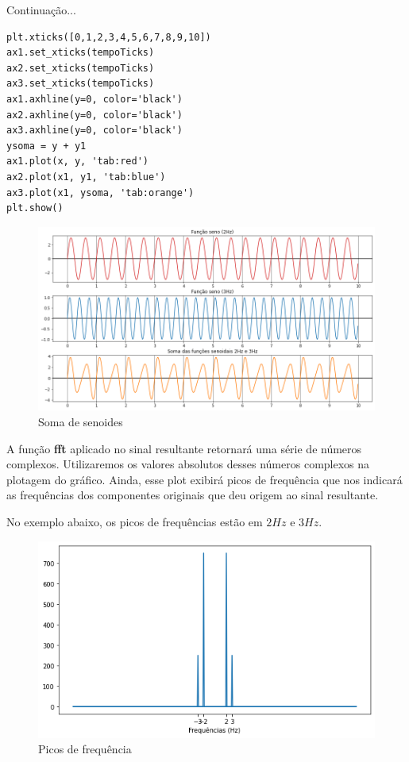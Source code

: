 Continuação...

\begin{verbatim}
plt.xticks([0,1,2,3,4,5,6,7,8,9,10])
ax1.set_xticks(tempoTicks)
ax2.set_xticks(tempoTicks)
ax3.set_xticks(tempoTicks)
ax1.axhline(y=0, color='black')
ax2.axhline(y=0, color='black')
ax3.axhline(y=0, color='black')
ysoma = y + y1
ax1.plot(x, y, 'tab:red')
ax2.plot(x1, y1, 'tab:blue')
ax3.plot(x1, ysoma, 'tab:orange')
plt.show()
\end{verbatim}

\begin{figure}[H]
	\centering
	\includegraphics[width=1\textwidth]{./Imagens/Transformada de Fourier/TF1.png} 
	\caption{Soma de senoides}
	\label{fig:TF1}
\end{figure}

A função \textbf{fft} aplicado no sinal resultante retornará uma série de números complexos. Utilizaremos os valores absolutos desses números complexos na plotagem do gráfico. Ainda, esse plot exibirá picos de frequência que nos indicará as frequências dos componentes originais que deu origem ao sinal resultante. 

No exemplo abaixo, os picos de frequências estão em $2Hz$ e $3Hz$.

\begin{figure}[H]
	\centering
	\includegraphics[width=1\textwidth]{./Imagens/Transformada de Fourier/TF2.png} 
	\caption{Picos de frequência}
	\label{fig:TF2}
\end{figure}

